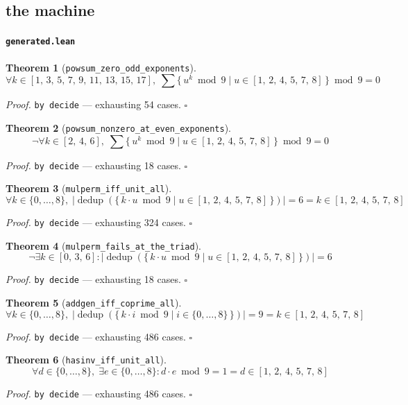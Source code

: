 \documentclass[11pt]{article}
\newtheorem{theorem}{Theorem}[section]
\begin{document}
\subsection{the machine}

\paragraph{\texttt{generated.lean}}

\begin{theorem}[\texttt{powsum\_zero\_odd\_exponents}]
\[ \forall k \in [1,\,3,\,5,\,7,\,9,\,11,\,13,\,15,\,17],\; \sum \{\, u^{k} \bmod 9 \mid u \in [1,\,2,\,4,\,5,\,7,\,8] \,\} \bmod 9 = 0 \]
\end{theorem}
\noindent\emph{Proof.} \texttt{by decide} --- exhausting 54 cases. \hfill$\square$

\begin{theorem}[\texttt{powsum\_nonzero\_at\_even\_exponents}]
\[ \lnot \forall k \in [2,\,4,\,6],\; \sum \{\, u^{k} \bmod 9 \mid u \in [1,\,2,\,4,\,5,\,7,\,8] \,\} \bmod 9 = 0 \]
\end{theorem}
\noindent\emph{Proof.} \texttt{by decide} --- exhausting 18 cases. \hfill$\square$

\begin{theorem}[\texttt{mulperm\_iff\_unit\_all}]
\[ \forall k \in \{0,\dots,8\},\; \left|\operatorname{dedup}\left(\{\, k \cdot u \bmod 9 \mid u \in [1,\,2,\,4,\,5,\,7,\,8] \,\}\right)\right| = 6 = k \in [1,\,2,\,4,\,5,\,7,\,8] \]
\end{theorem}
\noindent\emph{Proof.} \texttt{by decide} --- exhausting 324 cases. \hfill$\square$

\begin{theorem}[\texttt{mulperm\_fails\_at\_the\_triad}]
\[ \lnot \exists k \in [0,\,3,\,6] : \left|\operatorname{dedup}\left(\{\, k \cdot u \bmod 9 \mid u \in [1,\,2,\,4,\,5,\,7,\,8] \,\}\right)\right| = 6 \]
\end{theorem}
\noindent\emph{Proof.} \texttt{by decide} --- exhausting 18 cases. \hfill$\square$

\begin{theorem}[\texttt{addgen\_iff\_coprime\_all}]
\[ \forall k \in \{0,\dots,8\},\; \left|\operatorname{dedup}\left(\{\, k \cdot i \bmod 9 \mid i \in \{0,\dots,8\} \,\}\right)\right| = 9 = k \in [1,\,2,\,4,\,5,\,7,\,8] \]
\end{theorem}
\noindent\emph{Proof.} \texttt{by decide} --- exhausting 486 cases. \hfill$\square$

\begin{theorem}[\texttt{hasinv\_iff\_unit\_all}]
\[ \forall d \in \{0,\dots,8\},\; \exists e \in \{0,\dots,8\} : d \cdot e \bmod 9 = 1 = d \in [1,\,2,\,4,\,5,\,7,\,8] \]
\end{theorem}
\noindent\emph{Proof.} \texttt{by decide} --- exhausting 486 cases. \hfill$\square$
\end{document}
